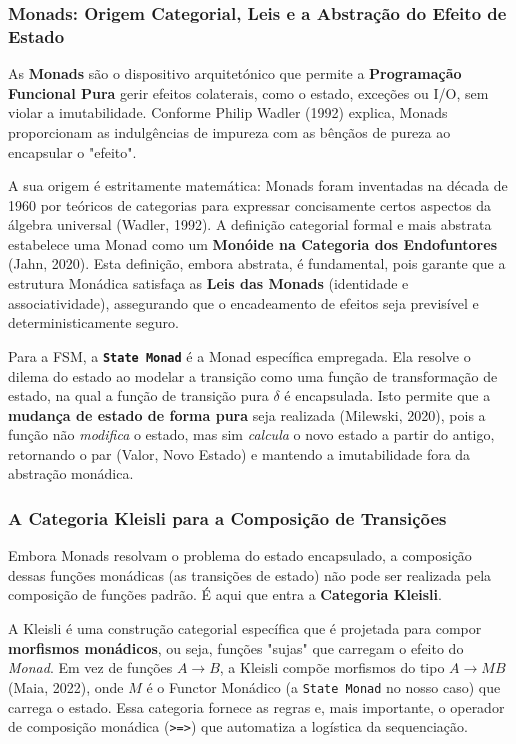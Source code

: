 \documentclass[12pt,a4paper]{article}
\begin{document}
\subsubsection{Monads: Origem Categorial, Leis e a Abstração do Efeito de Estado}

As \textbf{Monads} são o dispositivo arquitetónico que permite a \textbf{Programação Funcional Pura} gerir efeitos colaterais, como o estado, exceções ou I/O, sem violar a imutabilidade. Conforme Philip Wadler (1992) explica, Monads proporcionam as indulgências de impureza com as bênçãos de pureza ao encapsular o "efeito".

A sua origem é estritamente matemática: Monads foram inventadas na década de 1960 por teóricos de categorias para expressar concisamente certos aspectos da álgebra universal (Wadler, 1992). A definição categorial formal e mais abstrata estabelece uma Monad como um \textbf{Monóide na Categoria dos Endofuntores} (Jahn, 2020). Esta definição, embora abstrata, é fundamental, pois garante que a estrutura Monádica satisfaça as \textbf{Leis das Monads} (identidade e associatividade), assegurando que o encadeamento de efeitos seja previsível e deterministicamente seguro.

Para a FSM, a \textbf{\texttt{State Monad}} é a Monad específica empregada. Ela resolve o dilema do estado ao modelar a transição como uma função de transformação de estado, na qual a função de transição pura $\delta$ é encapsulada. Isto permite que a \textbf{mudança de estado de forma pura} seja realizada (Milewski, 2020), pois a função não \textit{modifica} o estado, mas sim \textit{calcula} o novo estado a partir do antigo, retornando o par (Valor, Novo Estado) e mantendo a imutabilidade fora da abstração monádica.

\subsubsection{A Categoria Kleisli para a Composição de Transições}

Embora Monads resolvam o problema do estado encapsulado, a composição dessas funções monádicas (as transições de estado) não pode ser realizada pela composição de funções padrão. É aqui que entra a \textbf{Categoria Kleisli}.

A Kleisli é uma construção categorial específica que é projetada para compor \textbf{morfismos monádicos}, ou seja, funções "sujas" que carregam o efeito do \textit{Monad}. Em vez de funções $A \to B$, a Kleisli compõe morfismos do tipo $A \to MB$ (Maia, 2022), onde $M$ é o Functor Monádico (a \texttt{State Monad} no nosso caso) que carrega o estado. Essa categoria fornece as regras e, mais importante, o operador de composição monádica (\texttt{>=>}) que automatiza a logística da sequenciação.
\end{document}
